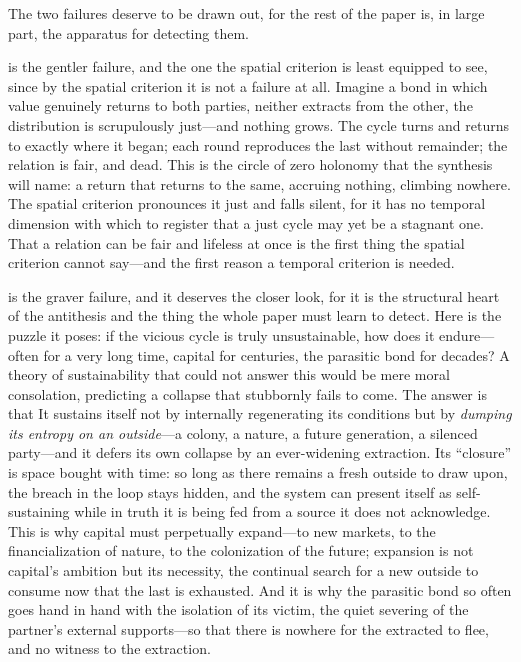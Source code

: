 The two failures deserve to be drawn out, for the rest of the paper is, in large part, the apparatus for detecting them.

 is the gentler failure, and the one the spatial criterion is least equipped to see, since by the spatial criterion it is not a failure at all. Imagine a bond in which value genuinely returns to both parties, neither extracts from the other, the distribution is scrupulously just---and nothing grows. The cycle turns and returns to exactly where it began; each round reproduces the last without remainder; the relation is fair, and dead. This is the circle of zero holonomy that the synthesis will name: a return that returns to the same, accruing nothing, climbing nowhere. The spatial criterion pronounces it just and falls silent, for it has no temporal dimension with which to register that a just cycle may yet be a stagnant one. That a relation can be fair and lifeless at once is the first thing the spatial criterion cannot say---and the first reason a temporal criterion is needed.

 is the graver failure, and it deserves the closer look, for it is the structural heart of the antithesis and the thing the whole paper must learn to detect. Here is the puzzle it poses: if the vicious cycle is truly unsustainable, how does it endure---often for a very long time, capital for centuries, the parasitic bond for decades? A theory of sustainability that could not answer this would be mere moral consolation, predicting a collapse that stubbornly fails to come. The answer is that  It sustains itself not by internally regenerating its conditions but by \emph{dumping its entropy on an outside}---a colony, a nature, a future generation, a silenced party---and it defers its own collapse by an ever-widening extraction. Its ``closure'' is space bought with time: so long as there remains a fresh outside to draw upon, the breach in the loop stays hidden, and the system can present itself as self-sustaining while in truth it is being fed from a source it does not acknowledge. This is why capital must perpetually expand---to new markets, to the financialization of nature, to the colonization of the future; expansion is not capital's ambition but its necessity, the continual search for a new outside to consume now that the last is exhausted. And it is why the parasitic bond so often goes hand in hand with the isolation of its victim, the quiet severing of the partner's external supports---so that there is nowhere for the extracted to flee, and no witness to the extraction. 

